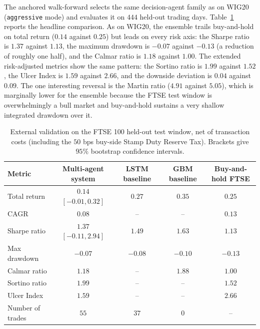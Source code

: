 \documentclass{ieeeaccess}
\newcommand{\FtseOOSDays}{\ensuremath{444}}
\newcommand{\FtseTRtest}{\ensuremath{0.14}}
\newcommand{\FtseCAGR}{\ensuremath{0.08}}
\newcommand{\FtseMDD}{\ensuremath{-0.07}}
\newcommand{\FtseSharpe}{\ensuremath{1.37}}
\newcommand{\FtseCalmar}{\ensuremath{1.18}}
\newcommand{\FtseNtrades}{\ensuremath{55}}
\newcommand{\FtseTRtestCIlow}{\ensuremath{-0.01}}
\newcommand{\FtseTRtestCIhigh}{\ensuremath{0.32}}
\newcommand{\FtseSharpeCIlow}{\ensuremath{-0.11}}
\newcommand{\FtseSharpeCIhigh}{\ensuremath{2.94}}
\newcommand{\FtseBHtest}{\ensuremath{0.25}}
\newcommand{\FtseBHcagr}{\ensuremath{0.13}}
\newcommand{\FtseBHmdd}{\ensuremath{-0.13}}
\newcommand{\FtseBHsharpe}{\ensuremath{1.13}}
\newcommand{\FtseBHcalmar}{\ensuremath{1.00}}
\newcommand{\FtseEnsSortino}{\ensuremath{1.99}}
\newcommand{\FtseBHSortino}{\ensuremath{1.52}}
\newcommand{\FtseEnsDownDev}{\ensuremath{0.04}}
\newcommand{\FtseBHDownDev}{\ensuremath{0.09}}
\newcommand{\FtseEnsUlcer}{\ensuremath{1.59}}
\newcommand{\FtseBHUlcer}{\ensuremath{2.66}}
\newcommand{\FtseEnsMartin}{\ensuremath{4.91}}
\newcommand{\FtseBHMartin}{\ensuremath{5.05}}
\newcommand{\FtseLSTMtest}{\ensuremath{0.27}}
\newcommand{\FtseLSTMsharpe}{\ensuremath{1.49}}
\newcommand{\FtseLSTMmdd}{\ensuremath{-0.08}}
\newcommand{\FtseLSTMtrades}{\ensuremath{37}}
\newcommand{\FtseGBMtest}{\ensuremath{0.35}}
\newcommand{\FtseGBMsharpe}{\ensuremath{1.63}}
\newcommand{\FtseGBMmdd}{\ensuremath{-0.10}}
\newcommand{\FtseGBMcalmar}{\ensuremath{1.88}}
\newcommand{\FtseGBMtrades}{\ensuremath{0}}
\begin{document}
The anchored walk-forward selects the same decision-agent family as on WIG20 (\texttt{aggressive} mode) and evaluates it on \FtseOOSDays{} held-out trading days. Table~\ref{tab:ftse} reports the headline comparison. As on WIG20, the ensemble trails buy-and-hold on total return (\FtseTRtest{} against \FtseBHtest{}) but leads on every risk axis: the Sharpe ratio is \FtseSharpe{} against \FtseBHsharpe{}, the maximum drawdown is \FtseMDD{} against \FtseBHmdd{} (a reduction of roughly one half), and the Calmar ratio is \FtseCalmar{} against \FtseBHcalmar{}. The extended risk-adjusted metrics show the same pattern: the Sortino ratio is \FtseEnsSortino{} against \FtseBHSortino{}, the Ulcer Index is \FtseEnsUlcer{} against \FtseBHUlcer{}, and the downside deviation is \FtseEnsDownDev{} against \FtseBHDownDev{}. The one interesting reversal is the Martin ratio (\FtseEnsMartin{} against \FtseBHMartin{}), which is marginally lower for the ensemble because the FTSE test window is overwhelmingly a bull market and buy-and-hold sustains a very shallow integrated drawdown over it.

\begin{table}[t]
\centering
\caption{External validation on the FTSE 100 held-out test window, net of transaction costs (including the $50$ bps buy-side Stamp Duty Reserve Tax). Brackets give $95\%$ bootstrap confidence intervals.}
\label{tab:ftse}
\begin{tabular}{lcccc}
\toprule
Metric & Multi-agent system & LSTM baseline & GBM baseline & Buy-and-hold FTSE \\
\midrule
Total return     & $\FtseTRtest$ $[\FtseTRtestCIlow, \FtseTRtestCIhigh]$ & $\FtseLSTMtest$   & $\FtseGBMtest$ & $\FtseBHtest$ \\
CAGR             & $\FtseCAGR$    & --              & -- & $\FtseBHcagr$ \\
Sharpe ratio     & $\FtseSharpe$ $[\FtseSharpeCIlow, \FtseSharpeCIhigh]$ & $\FtseLSTMsharpe$ & $\FtseGBMsharpe$ & $\FtseBHsharpe$ \\
Max drawdown     & $\FtseMDD$     & $\FtseLSTMmdd$  & $\FtseGBMmdd$ & $\FtseBHmdd$ \\
Calmar ratio     & $\FtseCalmar$  & --              & $\FtseGBMcalmar$ & $\FtseBHcalmar$ \\
Sortino ratio    & $\FtseEnsSortino$ & --           & -- & $\FtseBHSortino$ \\
Ulcer Index      & $\FtseEnsUlcer$   & --           & -- & $\FtseBHUlcer$ \\
Number of trades & $\FtseNtrades$ & $\FtseLSTMtrades$ & $\FtseGBMtrades$ & -- \\
\bottomrule
\end{tabular}
\end{table}
\end{document}
